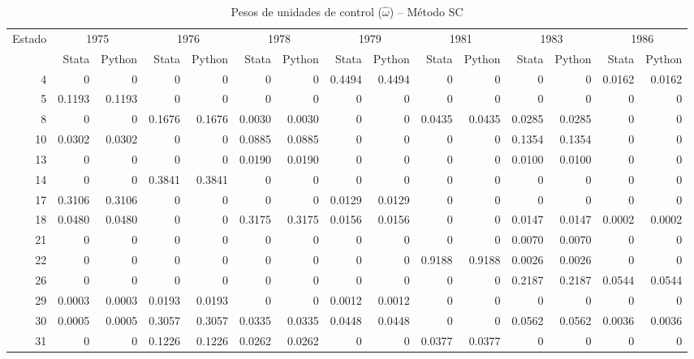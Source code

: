 \begin{table}[H]
\centering
\caption{Pesos de unidades de control ($\hat{\omega}$) -- M\'etodo SC}
\label{tab:omega_sc}
\footnotesize
\begin{tabular}{rrrrrrrrrrrrrrr}
\toprule
Estado & \multicolumn{2}{c}{1975} & \multicolumn{2}{c}{1976} & \multicolumn{2}{c}{1978} & \multicolumn{2}{c}{1979} & \multicolumn{2}{c}{1981} & \multicolumn{2}{c}{1983} & \multicolumn{2}{c}{1986} \\
 & \scriptsize Stata & \scriptsize Python & \scriptsize Stata & \scriptsize Python & \scriptsize Stata & \scriptsize Python & \scriptsize Stata & \scriptsize Python & \scriptsize Stata & \scriptsize Python & \scriptsize Stata & \scriptsize Python & \scriptsize Stata & \scriptsize Python \\
\midrule
4 & 0 & 0 & 0 & 0 & 0 & 0 & 0.4494 & 0.4494 & 0 & 0 & 0 & 0 & 0.0162 & 0.0162 \\
5 & 0.1193 & 0.1193 & 0 & 0 & 0 & 0 & 0 & 0 & 0 & 0 & 0 & 0 & 0 & 0 \\
8 & 0 & 0 & 0.1676 & 0.1676 & 0.0030 & 0.0030 & 0 & 0 & 0.0435 & 0.0435 & 0.0285 & 0.0285 & 0 & 0 \\
10 & 0.0302 & 0.0302 & 0 & 0 & 0.0885 & 0.0885 & 0 & 0 & 0 & 0 & 0.1354 & 0.1354 & 0 & 0 \\
13 & 0 & 0 & 0 & 0 & 0.0190 & 0.0190 & 0 & 0 & 0 & 0 & 0.0100 & 0.0100 & 0 & 0 \\
14 & 0 & 0 & 0.3841 & 0.3841 & 0 & 0 & 0 & 0 & 0 & 0 & 0 & 0 & 0 & 0 \\
17 & 0.3106 & 0.3106 & 0 & 0 & 0 & 0 & 0.0129 & 0.0129 & 0 & 0 & 0 & 0 & 0 & 0 \\
18 & 0.0480 & 0.0480 & 0 & 0 & 0.3175 & 0.3175 & 0.0156 & 0.0156 & 0 & 0 & 0.0147 & 0.0147 & 0.0002 & 0.0002 \\
21 & 0 & 0 & 0 & 0 & 0 & 0 & 0 & 0 & 0 & 0 & 0.0070 & 0.0070 & 0 & 0 \\
22 & 0 & 0 & 0 & 0 & 0 & 0 & 0 & 0 & 0.9188 & 0.9188 & 0.0026 & 0.0026 & 0 & 0 \\
26 & 0 & 0 & 0 & 0 & 0 & 0 & 0 & 0 & 0 & 0 & 0.2187 & 0.2187 & 0.0544 & 0.0544 \\
29 & 0.0003 & 0.0003 & 0.0193 & 0.0193 & 0 & 0 & 0.0012 & 0.0012 & 0 & 0 & 0 & 0 & 0 & 0 \\
30 & 0.0005 & 0.0005 & 0.3057 & 0.3057 & 0.0335 & 0.0335 & 0.0448 & 0.0448 & 0 & 0 & 0.0562 & 0.0562 & 0.0036 & 0.0036 \\
31 & 0 & 0 & 0.1226 & 0.1226 & 0.0262 & 0.0262 & 0 & 0 & 0.0377 & 0.0377 & 0 & 0 & 0 & 0 \\

\end{tabular}
\end{table}
